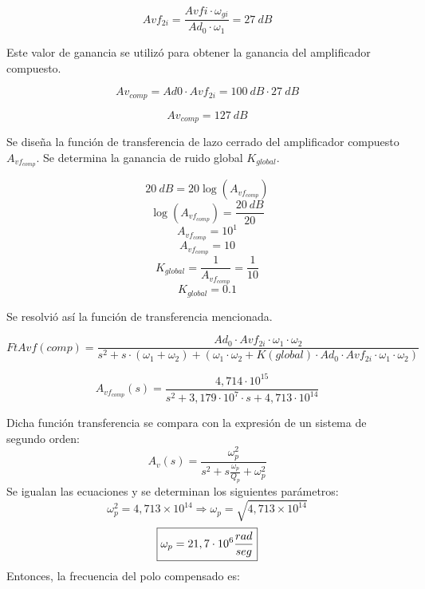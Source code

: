 \begin{equation}
    Avf_{2i}=\frac{Avfi \cdot \omega_{gi}}{Ad_0 \cdot \omega_1} = 27~dB
\end{equation}

\bigskip
\hspace{1mm} Este valor de ganancia se utilizó para obtener la ganancia del amplificador compuesto.

\begin{equation}
    Av_{comp}=Ad0\cdot Avf_{2i}=100~dB \cdot 27~dB
\end{equation}

\begin{equation}
    \boxed{
    Av_{comp} = 127~dB
    }
\end{equation}

\bigskip

\hspace{1mm} Se diseña la función de transferencia de lazo cerrado del amplificador compuesto \(A_{vf_{comp}}\). Se determina la ganancia de ruido global \(K_{global}\).

\[20~dB= 20 \log(A_{vf_{comp}})\]
\[\log(A_{vf_{comp}})=\frac{20~dB}{20}\]
\[A_{vf_{comp}}=10^{1}\]
\[A_{vf_{comp}}=10\]
\begin{equation}
    K_{global} = \frac{1}{A_{vf_{comp}}} = \frac{1}{10}
\end{equation}
\begin{equation}
    \boxed{
    K_{global} = 0.1
    }
\end{equation}

\bigskip
\hspace{1mm} Se resolvió así la función de transferencia mencionada.

\begin{equation}
    FtAvf (comp) = \frac{Ad_0 \cdot Avf_{2i} \cdot \omega_1 \cdot \omega_2}{s^2 + s \cdot (\omega_1 + \omega_2) + (\omega_1 \cdot \omega_2 + K (global) \cdot Ad_0 \cdot Avf_{2i} \cdot \omega_1 \cdot \omega_2)}
\end{equation}

\begin{equation}
    A_{vf_{comp}}(s) = \frac{4,714 \cdot 10^{15}}{s^2 + 3,179 \cdot 10^7 \cdot s + 4,713 \cdot 10^{14}}
\end{equation}

\bigskip
\hspace{1mm} Dicha función transferencia se compara con la expresión de un sistema de segundo orden:
\begin{equation}
    A_{v}(s) = \frac{\omega _p^2}{s^2 + s \frac{\omega _p}{Q_p } + \omega_p^2}
\end{equation}  
\bigskip
\hspace{1mm} Se igualan las ecuaciones y se determinan los siguientes parámetros:
\begin{equation}
    \omega _p ^2 = 4,713 \times 10^{14} \Longrightarrow \omega_p =\sqrt{4,713 \times 10^{14}} 
\end{equation}
\begin{equation}
    \boxed{
        \omega_p = 21,7 \cdot 10^6 \space \frac{rad}{seg} 
    }
\end{equation}
\bigskip
\hspace{1mm} Entonces, la frecuencia del polo compensado es:

